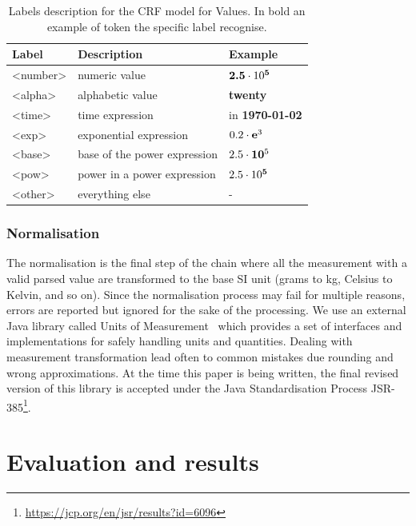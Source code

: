 \documentclass[sigconf]{acmart}
\begin{document}
\begin{table}[ht]
  \caption{Labels description for the CRF model for Values. In bold an example of token the specific label recognise.}
  \label{tab:values-model-labels}
  \begin{tabular}{lll}
    \toprule
    Label & Description & Example\\
    \midrule
    <number> & numeric value & $\textbf{2.5}\cdot10\textsuperscript{\textbf{5}}$ \\
    <alpha> & alphabetic value & \textbf{twenty} \\
    <time> & time expression  & in \textbf{1970-01-02}\\
    <exp> & exponential expression & $0.2\cdot\textbf{e}\textsuperscript{3}$ \\
    <base> & base of the power expression & $2.5\cdot\textbf{10}\textsuperscript{5}$\\
    <pow> & power in a power expression & $2.5\cdot10\textsuperscript{\textbf{5}}$ \\
    <other> & everything else & - \\
  \bottomrule
\end{tabular}
\end{table}

\subsubsection{Normalisation}

The normalisation is the final step of the chain where all the measurement with a valid parsed value are transformed to the base SI unit (grams to kg, Celsius to Kelvin, and so on). Since the normalisation process may fail for multiple reasons, errors are reported but ignored for the sake of the processing. We use an external Java library called Units of Measurement~\cite{units_of_measurement} which provides a set of interfaces and implementations for safely handling units and quantities. Dealing with measurement transformation lead often to common mistakes due rounding and wrong approximations. At the time this paper is being written, the final revised version of this library is accepted under the Java Standardisation Process JSR-385\footnote{\url{https://jcp.org/en/jsr/results?id=6096}}. 

\section{Evaluation and results}
\label{sec:results}
\end{document}
